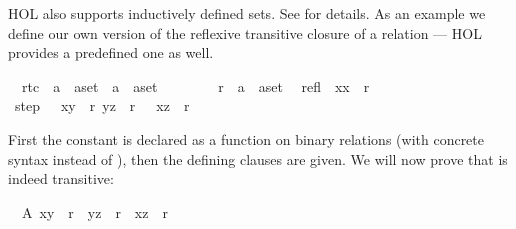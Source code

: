 \begin{isabellebody}
\begin{isamarkuptext}
HOL also supports inductively defined sets. See \cite{LNCS2283}
for details. As an example we define our own version of the reflexive
transitive closure of a relation --- HOL provides a predefined one as well.%
\end{isamarkuptext}%
\isamarkuptrue%
\isamarkupfalse%
\isanewline
\ \ rtc\ {\isacharcolon}{\isacharcolon}\ {\isachardoublequoteopen}{\isacharparenleft}{\isacharprime}a\ {\isasymtimes}\ {\isacharprime}a{\isacharparenright}set\ {\isasymRightarrow}\ {\isacharparenleft}{\isacharprime}a\ {\isasymtimes}\ {\isacharprime}a{\isacharparenright}set{\isachardoublequoteclose}\ \ \ {\isacharparenleft}{\isachardoublequoteopen}{\isacharunderscore}{\isacharasterisk}{\isachardoublequoteclose}\ {\isacharbrackleft}{}{}{}{}{\isacharbrackright}\ {}{}{}{\isacharparenright}\isanewline
\ \ \ r\ {\isacharcolon}{\isacharcolon}\ {\isachardoublequoteopen}{\isacharparenleft}{\isacharprime}a\ {\isasymtimes}\ {\isacharprime}a{\isacharparenright}set{\isachardoublequoteclose}\isanewline
{}\isanewline
\ \ refl{\isacharcolon}\ \ {\isachardoublequoteopen}{\isacharparenleft}x{\isacharcomma}x{\isacharparenright}\ {\isasymin}\ r{\isacharasterisk}{\isachardoublequoteclose}\isanewline
{\isacharbar}\ step{\isacharcolon}\ \ {\isachardoublequoteopen}{\isasymlbrakk}\ {\isacharparenleft}x{\isacharcomma}y{\isacharparenright}\ {\isasymin}\ r{\isacharsemicolon}\ {\isacharparenleft}y{\isacharcomma}z{\isacharparenright}\ {\isasymin}\ r{\isacharasterisk}\ {\isasymrbrakk}\ {\isasymLongrightarrow}\ {\isacharparenleft}x{\isacharcomma}z{\isacharparenright}\ {\isasymin}\ r{\isacharasterisk}{\isachardoublequoteclose}%
\begin{isamarkuptext}%
\noindent
First the constant is declared as a function on binary
relations (with concrete syntax  instead of ), then the defining clauses are given. We will now prove that
 is indeed transitive:%
\end{isamarkuptext}%
\isamarkuptrue%
\isamarkupfalse%
\ \ A{\isacharcolon}\ {\isachardoublequoteopen}{\isacharparenleft}x{\isacharcomma}y{\isacharparenright}\ {\isasymin}\ r{\isacharasterisk}{\isachardoublequoteclose}\ \ {\isachardoublequoteopen}{\isacharparenleft}y{\isacharcomma}z{\isacharparenright}\ {\isasymin}\ r{\isacharasterisk}\ {\isasymLongrightarrow}\ {\isacharparenleft}x{\isacharcomma}z{\isacharparenright}\ {\isasymin}\ r{\isacharasterisk}{\isachardoublequoteclose}\isanewline

\end{isabellebody}
